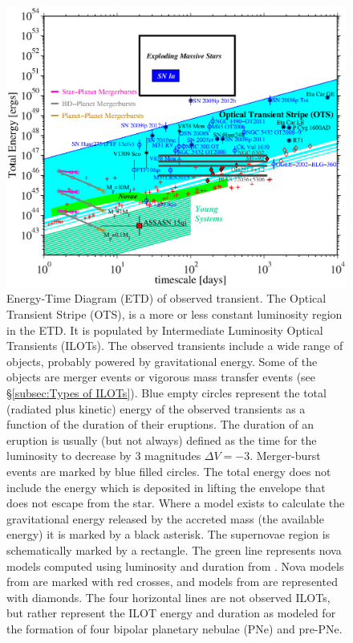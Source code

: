 \documentclass[modern]{aastex63}
\begin{document}
\begin{figure}[ht!]
    \begin{center}
        \includegraphics[width=1.0\textwidth]{etd.eps}
    \end{center}
    \caption{
        Energy-Time Diagram (ETD) of observed transient. 
        The Optical Transient Stripe (OTS), is a more or less constant luminosity region in the ETD. 
        It is populated by Intermediate Luminosity Optical Transients (ILOTs). 
        The observed transients include a wide range of objects, probably powered by gravitational energy.
        Some of the objects are merger events or vigorous mass transfer events (see \S\ref{subsec:Types of ILOTs}). 
        Blue empty circles represent the total (radiated plus kinetic) energy of the observed transients as a function of the duration of their eruptions. 
        The duration of an eruption is usually (but not always) defined as the time for the luminosity to decrease by 3 magnitudes $\Delta V=-3$.
        Merger-burst events are marked by blue filled circles.
        The total energy does not include the energy which is deposited in lifting the envelope that does not escape from the star. 
        Where a model exists to calculate the gravitational energy released by the accreted mass (the available energy) it is marked by a black asterisk.
        The supernovae region is schematically marked by a rectangle. 
        The green line represents nova models computed using luminosity and duration from \cite{1995ApJ...452..704D}. 
        Nova models from \cite{2005ApJ...623..398Y} are marked with red crosses, and models from \cite{2010ApJ...725..831S} are represented with diamonds.
        The four horizontal lines are not observed ILOTs, but rather represent the ILOT energy and duration as \cite{2012ApJ...746..100S} modeled for the formation of four bipolar planetary nebulae (PNe) and pre-PNe.
    }\label{fig:etd}
\end{figure}
\end{document}
